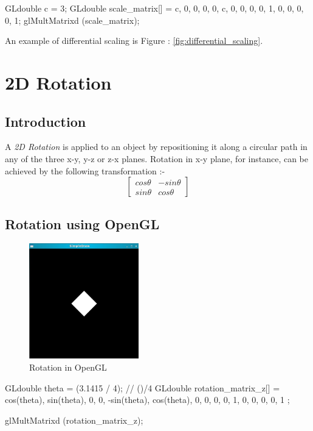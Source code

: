 \documentclass[a4paper,12pt,titlepage,twosided]{article}
\begin{document}
	\begin{code}
		GLdouble c   = 3;
		GLdouble scale_matrix[] = { c, 0, 0, 0, 
					    0, c, 0, 0,
					    0, 0, 1, 0, 
					    0, 0, 0, 1};
		glMultMatrixd (scale_matrix);
	\end{code}

	An example of differential scaling is Figure : \ref{fig:differential_scaling}.
	
\pagebreak
\section{2D Rotation}
	\subsection{Introduction}
	A \emph{2D Rotation} is applied to an object by repositioning it along a circular path in any of the three x-y, y-z or z-x planes. Rotation in x-y plane, for instance, can be achieved by the following transformation :-
	\begin{equation}
		\begin{bmatrix}
			cos \theta & -sin \theta \\
			sin \theta &  cos \theta 
		\end{bmatrix}
	\end{equation}

	\subsection {Rotation using OpenGL}

	\begin{figure}
		\centering
		\includegraphics[height=50mm]{Images_final/Rotated_square.jpg}
		\caption{Rotation in OpenGL}
		\label{fig:rotation}
	\end{figure}

	\begin{code}
		GLdouble theta = (3.1415 / 4);		// (\pi)/4
		GLdouble rotation_matrix_z[] = { cos(theta), sin(theta), 0, 0, 
						-sin(theta), cos(theta), 0, 0, 
						0, 0, 1, 0,
						0, 0, 0, 1 };

		glMultMatrixd (rotation_matrix_z);
	\end{code}
\end{document}
